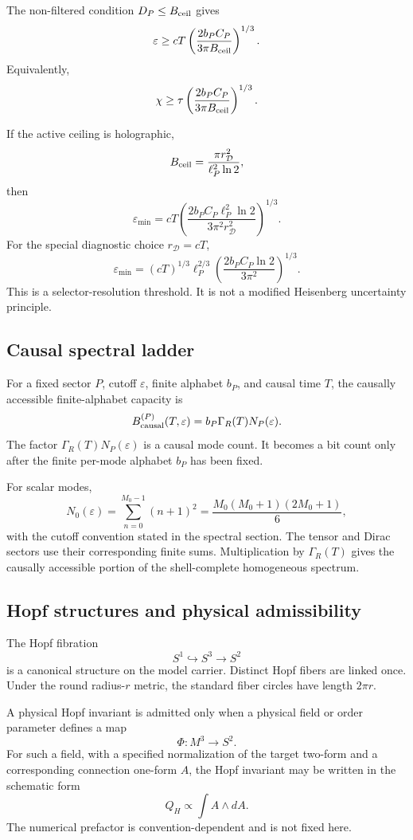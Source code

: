 \documentclass[11pt,a4paper]{article}
\begin{document}
The non-filtered condition \(D_P\le B_{\rm ceil}\) gives
\[
\varepsilon
\ge
cT
\left(
\frac{2b_PC_P}{3\pi B_{\rm ceil}}
\right)^{1/3}.
\]
Equivalently,
\[
\chi
\ge
\tau
\left(
\frac{2b_PC_P}{3\pi B_{\rm ceil}}
\right)^{1/3}.
\]

If the active ceiling is holographic,
\[
B_{\rm ceil}
=
\frac{\pi r_{\mathcal D}^2}{\ell_P^2\ln2},
\]
then
\[
\varepsilon_{\min}
=
cT
\left(
\frac{2b_PC_P\ell_P^2\ln2}
{3\pi^2r_{\mathcal D}^2}
\right)^{1/3}.
\]
For the special diagnostic choice \(r_{\mathcal D}=cT\),
\[
\varepsilon_{\min}
=
(cT)^{1/3}\ell_P^{2/3}
\left(
\frac{2b_PC_P\ln2}{3\pi^2}
\right)^{1/3}.
\]
This is a selector-resolution threshold.  It is not a modified Heisenberg uncertainty principle.

\subsection{Causal spectral ladder}

For a fixed sector \(P\), cutoff \(\varepsilon\), finite alphabet \(b_P\), and causal time \(T\), the causally accessible finite-alphabet capacity is
\[
B_{\rm causal}^{(P)}(T,\varepsilon)
=
b_P\Gamma_R(T)N_P(\varepsilon).
\]
The factor \(\Gamma_R(T)N_P(\varepsilon)\) is a causal mode count.  It becomes a bit count only after the finite per-mode alphabet \(b_P\) has been fixed.

For scalar modes,
\[
N_0(\varepsilon)
=
\sum_{n=0}^{M_0-1}(n+1)^2
=
\frac{M_0(M_0+1)(2M_0+1)}6,
\]
with the cutoff convention stated in the spectral section.  The tensor and Dirac sectors use their corresponding finite sums.  Multiplication by \(\Gamma_R(T)\) gives the causally accessible portion of the shell-complete homogeneous spectrum.

\subsection{Hopf structures and physical admissibility}

The Hopf fibration
\[
S^1\hookrightarrow S^3\to S^2
\]
is a canonical structure on the model carrier.  Distinct Hopf fibers are linked once.  Under the round radius-\(r\) metric, the standard fiber circles have length \(2\pi r\).

A physical Hopf invariant is admitted only when a physical field or order parameter defines a map
\[
\Phi:M^3\to S^2.
\]
For such a field, with a specified normalization of the target two-form and a corresponding connection one-form \(A\), the Hopf invariant may be written in the schematic form
\[
Q_H\propto\int A\wedge dA.
\]
The numerical prefactor is convention-dependent and is not fixed here.
\end{document}
